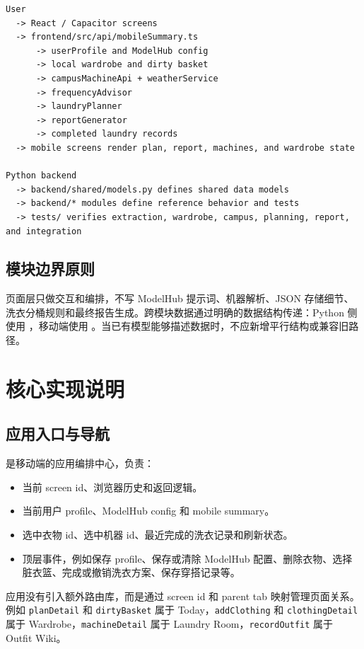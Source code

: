 \documentclass[11pt,a4paper]{ctexart}
\begin{document}
\begin{lstlisting}[style=command]
User
  -> React / Capacitor screens
  -> frontend/src/api/mobileSummary.ts
      -> userProfile and ModelHub config
      -> local wardrobe and dirty basket
      -> campusMachineApi + weatherService
      -> frequencyAdvisor
      -> laundryPlanner
      -> reportGenerator
      -> completed laundry records
  -> mobile screens render plan, report, machines, and wardrobe state

Python backend
  -> backend/shared/models.py defines shared data models
  -> backend/* modules define reference behavior and tests
  -> tests/ verifies extraction, wardrobe, campus, planning, report, and integration
\end{lstlisting}

\subsection{模块边界原则}

页面层只做交互和编排，不写 ModelHub 提示词、机器解析、JSON 存储细节、洗衣分桶规则和最终报告生成。跨模块数据通过明确的数据结构传递：Python 侧使用 ，移动端使用 。当已有模型能够描述数据时，不应新增平行结构或兼容旧路径。

\section{核心实现说明}

\subsection{应用入口与导航}

 是移动端的应用编排中心，负责：

\begin{itemize}
  \item 当前 screen id、浏览器历史和返回逻辑。
  \item 当前用户 profile、ModelHub config 和 mobile summary。
  \item 选中衣物 id、选中机器 id、最近完成的洗衣记录和刷新状态。
  \item 顶层事件，例如保存 profile、保存或清除 ModelHub 配置、删除衣物、选择脏衣篮、完成或撤销洗衣方案、保存穿搭记录等。
\end{itemize}

应用没有引入额外路由库，而是通过 screen id 和 parent tab 映射管理页面关系。例如 \texttt{planDetail} 和 \texttt{dirtyBasket} 属于 Today，\texttt{addClothing} 和 \texttt{clothingDetail} 属于 Wardrobe，\texttt{machineDetail} 属于 Laundry Room，\texttt{recordOutfit} 属于 Outfit Wiki。
\end{document}
